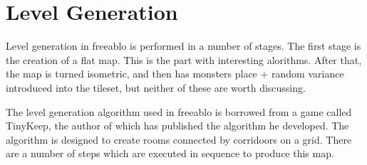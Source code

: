 \documentclass[a4paper]{article}
\begin{document}
    \section{Level Generation}
    Level generation in freeablo is performed in a number of stages. The first stage is the creation of a flat map. This is the part with interesting alorithms.
    After that, the map is turned isometric, and then has monsters place + random variance introduced into the tileset, but neither of these are worth discussing.

    \mbox{}

    The level generation algorithm used in freeablo is borrowed from a game called TinyKeep\cite{tinykeep}, the author of which has published the algorithm he developed\cite{tinygen}.
    The algorithm is designed to create rooms connected by corridoors on a grid.
    There are a number of steps which are executed in sequence to produce this map.
\end{document}
